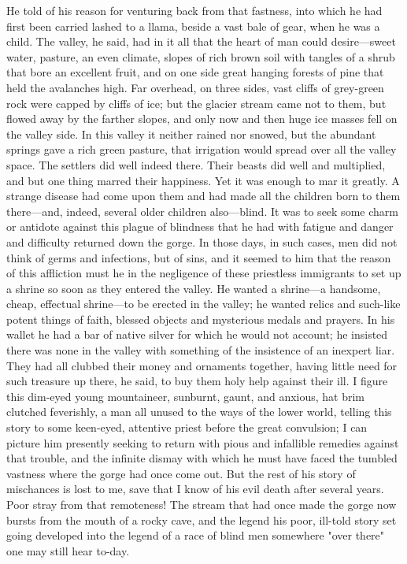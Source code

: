 \documentclass[submission]{sffms}
\begin{document}
He told of his reason for venturing back from that fastness, into
which he had first been carried lashed to a llama, beside a vast bale
of gear, when he was a child. The valley, he said, had in it all that
the heart of man could desire---sweet water, pasture, an even climate,
slopes of rich brown soil with tangles of a shrub that bore an
excellent fruit, and on one side great hanging forests of pine that
held the avalanches high. Far overhead, on three sides, vast cliffs of
grey-green rock were capped by cliffs of ice; but the glacier stream
came not to them, but flowed away by the farther slopes, and only now
and then huge ice masses fell on the valley side. In this valley it
neither rained nor snowed, but the abundant springs gave a rich green
pasture, that irrigation would spread over all the valley space. The
settlers did well indeed there.  Their beasts did well and multiplied,
and but one thing marred their happiness.  Yet it was enough to mar it
greatly. A strange disease had come upon them and had made all the
children born to them there---and, indeed, several older children
also---blind. It was to seek some charm or antidote against this plague
of blindness that he had with fatigue and danger and difficulty
returned down the gorge. In those days, in such cases, men did not
think of germs and infections, but of sins, and it seemed to him that
the reason of this affliction must he in the negligence of these
priestless immigrants to set up a shrine so soon as they entered the
valley. He wanted a shrine---a handsome, cheap, effectual shrine---to be
erected in the valley; he wanted relics and such-like potent things of
faith, blessed objects and mysterious medals and prayers. In his
wallet he had a bar of native silver for which he would not account;
he insisted there was none in the valley with something of the
insistence of an inexpert liar. They had all clubbed their money and
ornaments together, having little need for such treasure up there, he
said, to buy them holy help against their ill. I figure this dim-eyed
young mountaineer, sunburnt, gaunt, and anxious, hat brim clutched
feverishly, a man all unused to the ways of the lower world, telling
this story to some keen-eyed, attentive priest before the great
convulsion; I can picture him presently seeking to return with pious
and infallible remedies against that trouble, and the infinite dismay
with which he must have faced the tumbled vastness where the gorge had
once come out. But the rest of his story of mischances is lost to me,
save that I know of his evil death after several years. Poor stray
from that remoteness! The stream that had once made the gorge now
bursts from the mouth of a rocky cave, and the legend his poor,
ill-told story set going developed into the legend of a race of blind
men somewhere "over there" one may still hear to-day.
\end{document}

